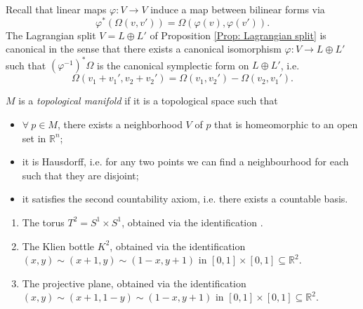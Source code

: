 \documentclass[12pt]{book}
\begin{document}
\begin{Rmk}\label{Rmk: The Lagrangian split is canonical}
    Recall that linear maps $\varphi:V\to V$ induce a map between bilinear forms via
    \[
    \varphi^\ast(\Omega(v,v')) = \Omega(\varphi(v),\varphi(v')).
    \] 
    The Lagrangian split $V=L\oplus L'$ of Proposition \ref{Prop: Lagrangian split} is canonical in the sense that there exists a canonical isomorphism $\varphi:V\to L\oplus L'$ such that $(\varphi^{-1})^\ast\Omega$ is the canonical symplectic form on $L\oplus L'$, i.e.
    \[
    \Omega(v_1+v_1', v_2+v_2') = \Omega(v_1,v_2') - \Omega(v_2,v_1').
    \] 
    
\end{Rmk}

\begin{Dfn}\label{Dfn: Topological manifold}
    $M$ is a \emph{topological manifold} if it is a topological space such that
    \begin{itemize}
    
        \item $\forall \ p\in M$, there exists a neighborhood $V$ of $p$ that is homeomorphic to an open set in $\mathbb{R}^n$;

        \item it is Hausdorff, i.e. for any two points we can find a neighbourhood for each such that they are disjoint;

        \item it satisfies the second countability axiom, i.e. there exists a countable basis.
    \end{itemize}
\end{Dfn}

\begin{Exp}\leavevmode
    \begin{enumerate}[label=\ExpLbl]
    
        \item The torus $T^2=S^1\times S^1$, obtained via the identification .

        \item The Klien bottle $K^2$, obtained via the identification $(x,y)\sim (x+1,y)\sim (1-x,y+1)$ in $[0,1]\times[0,1]\subseteq \mathbb{R}^2$.

        \item The projective plane, obtained via the identification $(x,y)\sim (x+1,1-y)\sim (1-x,y+1)$ in $[0,1]\times[0,1]\subseteq \mathbb{R}^2$.
    \end{enumerate}
\end{Exp}
\end{document}

